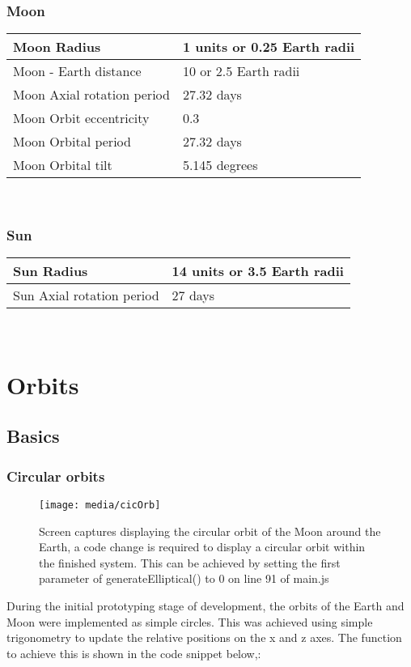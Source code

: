 \documentclass[titlepage]{article}
\begin{document}
\subsubsection{Moon}
 \begin{tabularx}{0.75\columnwidth}{| X | X |}
            \hline
            Moon Radius & 1 units or 0.25 Earth radii \\
            \hline
            Moon - Earth distance  & 10 or 2.5 Earth radii \\
            \hline            
            Moon Axial rotation period & 27.32 days \\
            \hline
			Moon Orbit eccentricity & 0.3 \\
			\hline
			Moon Orbital period & 27.32 days \\
			\hline
			Moon Orbital tilt & 5.145 degrees \\
			\hline
\end{tabularx} \\

\subsubsection{Sun}
 \begin{tabularx}{0.75\columnwidth}{| X | X |}
            \hline
            Sun Radius & 14 units or 3.5 Earth radii \\
            \hline
            Sun Axial rotation period & 27 days \\
            \hline			
        \end{tabularx} \\
\section{Orbits}

\subsection{Basics}
\subsubsection{Circular orbits}
\begin{figure}[h!]
                \centering
                \texttt{[image: media/cicOrb]}
                \caption{Screen captures displaying the circular orbit of the Moon around the Earth, a code change is required to display a circular orbit within the finished system. This can be achieved by setting the first parameter of generateElliptical() to 0 on line 91 of main.js }
            \end{figure}
During the initial prototyping stage of development, the orbits of the Earth and Moon were implemented as simple circles. This was achieved using simple trigonometry to update the relative positions on the x and z axes. The function to achieve this is shown in the code snippet below,:
\end{document}
